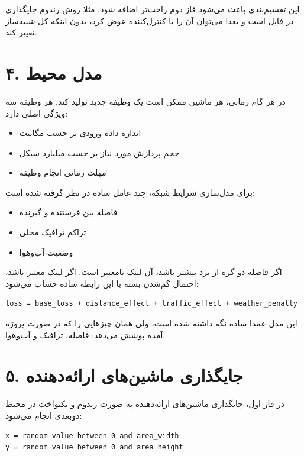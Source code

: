\documentclass[12pt]{exam}
\begin{document}
\begin{questions}
این تقسیم‌بندی باعث می‌شود فاز دوم راحت‌تر اضافه شود. مثلا روش رندوم جایگذاری
در فایل  است و بعدا می‌توان آن را با کنترل‌کننده
 عوض کرد، بدون اینکه کل شبیه‌ساز تغییر کند.

\section*{۴. مدل محیط}
در هر گام زمانی، هر ماشین ممکن است یک وظیفه جدید تولید کند. هر وظیفه سه ویژگی اصلی
دارد:

\begin{itemize}
\item اندازه داده ورودی بر حسب مگابیت
\item حجم پردازش مورد نیاز بر حسب میلیارد سیکل
\item مهلت زمانی انجام وظیفه
\end{itemize}

برای مدل‌سازی شرایط شبکه، چند عامل ساده در نظر گرفته شده است:

\begin{itemize}
\item فاصله بین فرستنده و گیرنده
\item تراکم ترافیک محلی
\item وضعیت آب‌وهوا
\end{itemize}

اگر فاصله دو گره از برد بیشتر باشد، آن لینک نامعتبر است. اگر لینک معتبر باشد،
احتمال گم‌شدن بسته با این رابطه ساده حساب می‌شود:

\begin{latin}
\begin{lstlisting}
loss = base_loss + distance_effect + traffic_effect + weather_penalty
\end{lstlisting}
\end{latin}

این مدل عمدا ساده نگه داشته شده است، ولی همان چیزهایی را که در صورت پروژه آمده
پوشش می‌دهد: فاصله، ترافیک و آب‌وهوا.

\section*{۵. جایگذاری ماشین‌های ارائه‌دهنده}
در فاز اول، جایگذاری ماشین‌های ارائه‌دهنده به صورت رندوم و یکنواخت در محیط
دوبعدی انجام می‌شود:

\begin{latin}
\begin{lstlisting}
x = random value between 0 and area_width
y = random value between 0 and area_height
\end{lstlisting}
\end{latin}


\end{questions}
\end{document}
